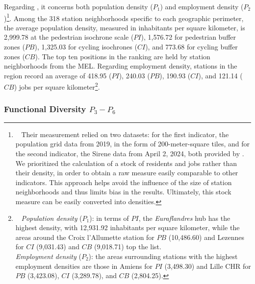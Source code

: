 \begin{refsegment}
Regarding , it concerns both population density (\(P_{1}\)) and employment density (\(P_{2}\))\footnote{~
    Their measurement relied on two datasets: for the first indicator, the population grid data from 2019, in the form of 200-meter-square tiles, and for the second indicator, the \acrfull{Sirene} data from April 2, 2024, both provided by \textcolor{blue}{\textcite{insee_grille_2021}}. We prioritized the calculation of a stock of residents and jobs rather than their density, in order to obtain a raw measure easily comparable to other indicators. This approach helps avoid the influence of the size of station neighborhoods and thus limits bias in the results. Ultimately, this stock measure can be easily converted into densities.
}. Among the 318 station neighborhoods specific to each geographic perimeter, the average population density, measured in inhabitants per square kilometer, is 2,999.78 at the pedestrian isochrone scale (\(PI\)), 1,576.72 for pedestrian buffer zones (\(PB\)), 1,325.03 for cycling isochrones (\(CI\)), and 773.68 for cycling buffer zones (\(CB\)). The top ten positions in the ranking are held by station neighborhoods from the \acrshort{MEL}. Regarding employment density, stations in the region record an average of 418.95 (\(PI\)), 240.03 (\(PB\)), 190.93 (\(CI\)), and 121.14 (\(CB\)) jobs per square kilometer\footnote{~
    \textsl{Population density} (\(P_{1}\)): in terms of \(PI\), the \textsl{Euraflandres} hub has the highest density, with 12,931.92 inhabitants per square kilometer, while the areas around the Croix l'Allumette station for \(PB\) (10,486.60) and Lezennes for \(CI\) (9,031.43) and \(CB\) (9,018.71) top the list.
    \\
    \textsl{Employment density} (\(P_{2}\)): the areas surrounding stations with the highest employment densities are those in Amiens for \(PI\) (3,498.30) and Lille CHR for \(PB\) (3,423.08), \(CI\) (3,289.78), and \(CB\) (2,804.25).
}.%

\subsubsection*{Functional Diversity \(P_{3} - P_{6}\)
    \label{chap6:indicateurs-place-diversite}
    }
    

\end{refsegment}
